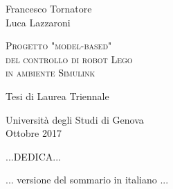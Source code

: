 \documentclass[a4paper,12pt,twoside,openright]{book}
\newenvironment{abstract}
{\cleardoublepage
	\thispagestyle{empty}
	\null \vfill\begin{center}
		\bfseries \abstractname \end{center}}
{\vfill\null}
\begin{document}
\thispagestyle{empty}
\begin{center}
	Francesco Tornatore\\
	Luca Lazzaroni
\end{center}

\null{}

\begin{center}
	\begin{Huge}
		\textsc{Progetto "model-based"\\
			 del controllo di robot Lego\\
			 in ambiente Simulink\\}
	\end{Huge}
\end{center}
\begin{center}
	Tesi di Laurea Triennale
\end{center}

\null
\null
\vfill
\begin{center}
	Università degli Studi di Genova\\
	Ottobre 2017
\end{center}
\clearpage


\begin{flushright}
	\null{}
	...DEDICA...
	\null
\end{flushright}

\begin{abstract}
	\begin{center}
		... versione del sommario in italiano ...
	\end{center}
\end{abstract}


\tableofcontents




\end{document}
